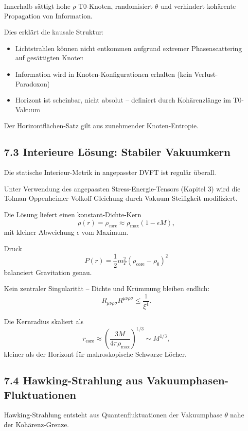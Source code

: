 	Innerhalb sättigt hohe $\rho$ T0-Knoten, randomisiert $\theta$ und verhindert kohärente Propagation von Information.
	
	Dies erklärt die kausale Struktur:
	\begin{itemize}
		\item Lichtstrahlen können nicht entkommen aufgrund extremer Phasenscattering auf gesättigten Knoten
		\item Information wird in Knoten-Konfigurationen erhalten (kein Verlust-Paradoxon)
		\item Horizont ist scheinbar, nicht absolut – definiert durch Kohärenzlänge im T0-Vakuum
	\end{itemize}
	
	Der Horizontflächen-Satz gilt aus zunehmender Knoten-Entropie.
	
	\subsection{7.3 Interieure Lösung: Stabiler Vakuumkern}
	
	Die statische Interieur-Metrik in angepasster DVFT ist regulär überall.
	
	Unter Verwendung des angepassten Stress-Energie-Tensors (Kapitel 3) wird die Tolman-Oppenheimer-Volkoff-Gleichung durch Vakuum-Steifigkeit modifiziert.
	
	Die Lösung liefert einen konstant-Dichte-Kern
	\[
	\rho(r) = \rho_{\text{core}} \approx \rho_{\text{max}} (1 - \epsilon M),
	\]
	mit kleiner Abweichung $\epsilon$ vom Maximum.
	
	Druck
	\[
	P(r) = \frac{1}{2} m_T^2 (\rho_{\text{core}} - \rho_0)^2
	\]
	balanciert Gravitation genau.
	
	Kein zentraler Singularität – Dichte und Krümmung bleiben endlich:
	\[
	R_{\mu\nu\rho\sigma} R^{\mu\nu\rho\sigma} \leq \frac{1}{\xi^4}.
	\]
	
	Die Kernradius skaliert als
	\[
	r_{\text{core}} \approx \left(\frac{3M}{4\pi \rho_{\text{max}}}\right)^{1/3} \sim M^{1/3},
	\]
	kleiner als der Horizont für makroskopische Schwarze Löcher.
	
	\subsection{7.4 Hawking-Strahlung aus Vakuumphasen-Fluktuationen}
	
	Hawking-Strahlung entsteht aus Quantenfluktuationen der Vakuumphase $\theta$ nahe der Kohärenz-Grenze.
	
